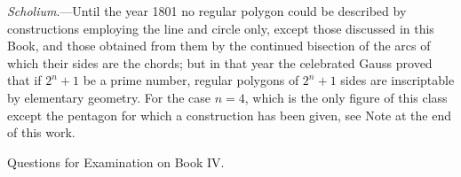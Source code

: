 \documentclass[oneside]{book}
\newcommand\exhead[1]{
\Needspace*{5\baselineskip}\begin{center}
\textsf{#1}
\end{center}
}
\begin{document}

\begin{footnotesize}
\textit{Scholium}.---Until the year 1801 no regular polygon could be
described by constructions employing the line and circle only,
except those discussed in this Book, and those obtained from
them by the continued bisection of the arcs of which their sides
are the chords; but in that year the celebrated Gauss proved that
if $2^n+1$ be a prime number, regular polygons of $2^n+1$ sides are
inscriptable by elementary geometry. For the case $n=4$, which
is the only figure of this class except the pentagon for which
a construction has been given, see Note at the end of this work.
\par\end{footnotesize}

\exhead{Questions for Examination on Book IV\@.}
\end{document}
